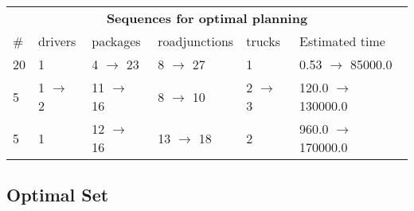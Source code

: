 \documentclass{article}
\begin{document}
                            \begin{center}
                            \begin{tabular}{l|l|l|l|l|l}
                            \multicolumn{6}{c}{\bf \large Sequences for optimal planning}\\
                            \# & drivers & packages & roadjunctions & trucks & Estimated time\\\midrule
                            20&1&4 $\rightarrow$ 23&8 $\rightarrow$ 27&1&0.53 $\rightarrow$ 85000.0\\
5&1 $\rightarrow$ 2&11 $\rightarrow$ 16&8 $\rightarrow$ 10&2 $\rightarrow$ 3&120.0 $\rightarrow$ 130000.0\\
5&1&12 $\rightarrow$ 16&13 $\rightarrow$ 18&2&960.0 $\rightarrow$ 170000.0
                            \end{tabular}
                            \end{center}
                    
                                \subsection*{Optimal Set}
                                
\end{document}
